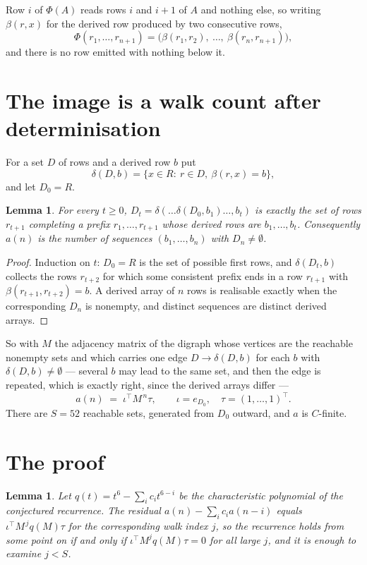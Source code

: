 \documentclass[11pt,a4paper]{article}
\theoremstyle{plain}
\newtheorem{lemma}[theorem]{Lemma}
\theoremstyle{definition}
\begin{document}
Row $i$ of $\Phi(A)$ reads rows $i$ and $i+1$ of $A$ and nothing else, so
writing $\beta(r,x)$ for the derived row produced by two consecutive rows,
\[
\Phi(r_1,\dots,r_{n+1})=\bigl(\beta(r_1,r_2),\ \dots,\ \beta(r_n,r_{n+1})\bigr),
\]
and there is no row emitted with nothing below it.

\section{The image is a walk count after determinisation}

For a set $D$ of rows and a derived row $b$ put
\[
\delta(D,b)=\{x\in R:\ r\in D,\ \beta(r,x)=b\},
\]
and let $D_0=R$.

\begin{lemma}\label{lem:det}
For every $t\ge0$, $D_t=\delta(\dots\delta(D_0,b_1)\dots,b_t)$ is exactly the set of rows
$r_{t+1}$ completing a prefix $r_1,\dots,r_{t+1}$ whose derived rows are $b_1,\dots,b_t$.
Consequently $a(n)$ is the number of sequences $(b_1,\dots,b_n)$ with $D_n\neq\emptyset$.
\end{lemma}

\begin{proof}
Induction on $t$: $D_0=R$ is the set of possible first rows, and $\delta(D_t,b)$ collects the
rows $r_{t+2}$ for which some consistent prefix ends in a row $r_{t+1}$ with
$\beta(r_{t+1},r_{t+2})=b$. A derived array of $n$ rows is realisable exactly when the
corresponding $D_n$ is nonempty, and distinct sequences are distinct derived arrays.
\end{proof}

So with $M$ the adjacency matrix of the digraph whose vertices are the reachable nonempty sets
and which carries one edge $D\to\delta(D,b)$ for each $b$ with $\delta(D,b)\neq\emptyset$ ---
several $b$ may lead to the same set, and then the edge is repeated, which is exactly right,
since the derived arrays differ ---
\[
a(n)\;=\;\iota^{\!\top}M^{\,n}\tau,\qquad \iota=e_{D_0},\quad \tau=(1,\dots,1)^{\!\top} .
\]
There are $S=52$ reachable sets, generated from $D_0$ outward, and $a$ is $C$-finite.


\section{The proof}

\begin{lemma}\label{lem:crit}
Let $q(t)=t^{6}-\sum_i c_it^{6-i}$ be the characteristic polynomial of the
conjectured recurrence. The residual $a(n)-\sum_ic_ia(n-i)$ equals
$\iota^{\!\top}M^{\,j}q(M)\tau$ for the corresponding walk index $j$, so the recurrence
holds from some point on if and only if $\iota^{\!\top}M^{j}q(M)\tau=0$ for all large $j$,
and it is enough to examine $j<S$.
\end{lemma}
\end{document}
